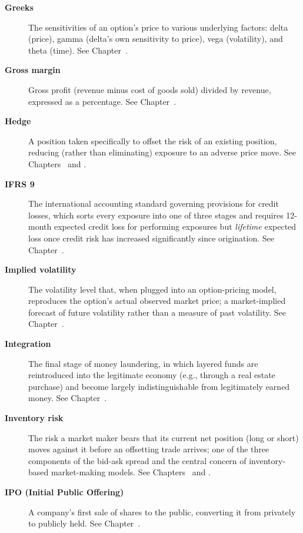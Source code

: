 \documentclass[../ai_in_finance]{subfiles}
\begin{document}
\begin{description}
\item[\textbf{Greeks}] The sensitivities of an option's price to various underlying factors: delta (price), gamma (delta's own sensitivity to price), vega (volatility), and theta (time). See Chapter~.

\item[\textbf{Gross margin}] Gross profit (revenue minus cost of goods sold) divided by revenue, expressed as a percentage. See Chapter~.

\item[\textbf{Hedge}] A position taken specifically to offset the risk of an existing position, reducing (rather than eliminating) exposure to an adverse price move. See Chapters~ and .

\item[\textbf{IFRS 9}] The international accounting standard governing provisions for credit losses, which sorts every exposure into one of three stages and requires 12-month expected credit loss for performing exposures but \emph{lifetime} expected loss once credit risk has increased significantly since origination. See Chapter~.
\item[\textbf{Implied volatility}] The volatility level that, when plugged into an option-pricing model, reproduces the option's actual observed market price; a market-implied forecast of future volatility rather than a measure of past volatility. See Chapter~.

\item[\textbf{Integration}] The final stage of money laundering, in which layered funds are reintroduced into the legitimate economy (e.g., through a real estate purchase) and become largely indistinguishable from legitimately earned money. See Chapter~.

\item[\textbf{Inventory risk}] The risk a market maker bears that its current net position (long or short) moves against it before an offsetting trade arrives; one of the three components of the bid-ask spread and the central concern of inventory-based market-making models. See Chapters~ and .

\item[\textbf{IPO (Initial Public Offering)}] A company's first sale of shares to the public, converting it from privately to publicly held. See Chapter~.


\end{description}
\end{document}
